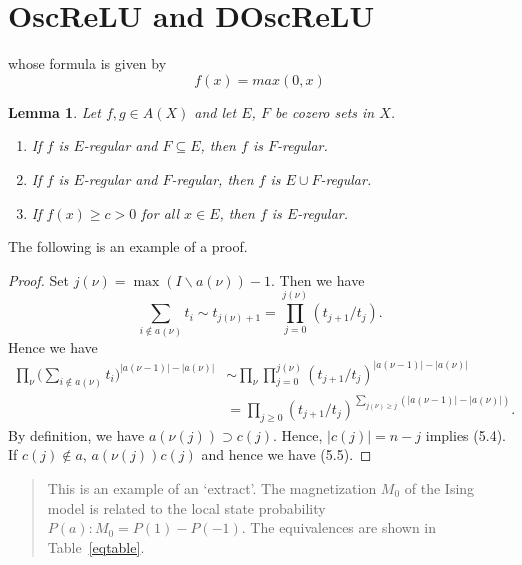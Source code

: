 \documentclass{amsart}
\newtheorem{lemma}[theorem]{Lemma}
\theoremstyle{definition}
\theoremstyle{remark}
\numberwithin{equation}{section}
\newcommand{\abs}[1]{\lvert#1\rvert}
\begin{document}
\section{OscReLU and DOscReLU}  





whose formula is given by $$f(x) = max(0,x)$$

\begin{lemma}
Let $f, g\in  A(X)$ and let $E$, $F$ be cozero
sets in $X$.
\begin{enumerate}
\item If $f$ is $E$-regular and $F\subseteq E$, then $f$ is $F$-regular.

\item If $f$ is $E$-regular and $F$-regular, then $f$ is $E\cup
F$-regular.

\item If $f(x)\ge c>0$ for all $x\in E$, then $f$ is $E$-regular.

\end{enumerate}
\end{lemma}

The following is an example of a proof.

\begin{proof} Set $j(\nu)=\max(I\backslash a(\nu))-1$. Then we have
\[
\sum_{i\notin a(\nu)}t_i\sim t_{j(\nu)+1}
  =\prod^{j(\nu)}_{j=0}(t_{j+1}/t_j).
\]
Hence we have
\begin{equation}
\begin{split}
\prod_\nu\biggl(\sum_{i\notin
  a(\nu)}t_i\biggr)^{\abs{a(\nu-1)}-\abs{a(\nu)}}
&\sim\prod_\nu\prod^{j(\nu)}_{j=0}
  (t_{j+1}/t_j)^{\abs{a(\nu-1)}-\abs{a(\nu)}}\\
&=\prod_{j\ge 0}(t_{j+1}/t_j)^{
  \sum_{j(\nu)\ge j}(\abs{a(\nu-1)}-\abs{a(\nu)})}.
\end{split}
\end{equation}
By definition, we have $a(\nu(j))\supset c(j)$. Hence, $\abs{c(j)}=n-j$
implies (5.4). If $c(j)\notin a$, $a(\nu(j))c(j)$ and hence
we have (5.5).
\end{proof}

\begin{quotation}
This is an example of an `extract'. The magnetization $M_0$ of the Ising
model is related to the local state probability $P(a):M_0=P(1)-P(-1)$.
The equivalences are shown in Table~\ref{eqtable}.
\end{quotation}
\end{document}
